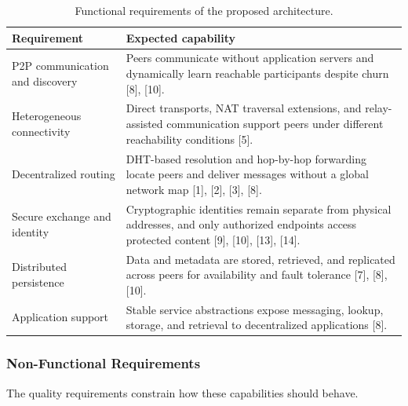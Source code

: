 \documentclass[12pt]{article}
\begin{document}
\begin{table}[H]
\centering
\caption{Functional requirements of the proposed architecture.}
\label{tab:functional-requirements}
\begin{tabularx}{\textwidth}{L{0.27\textwidth} Y}
\toprule
\textbf{Requirement} & \textbf{Expected capability} \\
\midrule
P2P communication and discovery & Peers communicate without application servers and dynamically learn reachable participants despite churn [8], [10]. \\
Heterogeneous connectivity & Direct transports, NAT traversal extensions, and relay-assisted communication support peers under different reachability conditions [5]. \\
Decentralized routing & DHT-based resolution and hop-by-hop forwarding locate peers and deliver messages without a global network map [1], [2], [3], [8]. \\
Secure exchange and identity & Cryptographic identities remain separate from physical addresses, and only authorized endpoints access protected content [9], [10], [13], [14]. \\
Distributed persistence & Data and metadata are stored, retrieved, and replicated across peers for availability and fault tolerance [7], [8], [10]. \\
Application support & Stable service abstractions expose messaging, lookup, storage, and retrieval to decentralized applications [8]. \\
\bottomrule
\end{tabularx}
\end{table}

\subsubsection{Non-Functional Requirements}

The quality requirements constrain how these capabilities should behave.
\end{document}
